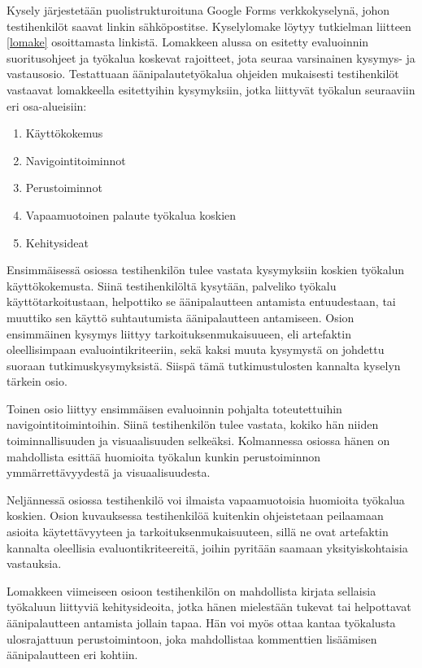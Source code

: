\documentclass[utf8]{gradu3}
\begin{document}
Kysely järjestetään puolistrukturoituna Google Forms verkkokyselynä, johon testihenkilöt saavat linkin sähköpostitse. Kyselylomake löytyy tutkielman liitteen \ref{lomake} osoittamasta linkistä. Lomakkeen alussa on esitetty evaluoinnin suoritusohjeet ja työkalua koskevat rajoitteet, jota seuraa varsinainen kysymys- ja vastausosio. Testattuaan äänipalautetyökalua ohjeiden mukaisesti testihenkilöt vastaavat lomakkeella esitettyihin kysymyksiin, jotka liittyvät työkalun seuraaviin eri osa-alueisiin:

\begin{enumerate}
  \item Käyttökokemus
  \item Navigointitoiminnot
  \item Perustoiminnot
  \item Vapaamuotoinen palaute työkalua koskien
  \item Kehitysideat
\end{enumerate}

Ensimmäisessä osiossa testihenkilön tulee vastata kysymyksiin koskien työkalun käyttökokemusta. Siinä testihenkilöltä kysytään, palveliko työkalu käyttötarkoitustaan, helpottiko se äänipalautteen antamista entuudestaan, tai muuttiko sen käyttö suhtautumista äänipalautteen antamiseen. Osion ensimmäinen kysymys liittyy tarkoituksenmukaisuueen, eli artefaktin oleellisimpaan evaluointikriteeriin, sekä kaksi muuta kysymystä on johdettu suoraan tutkimuskysymyksistä. Siispä tämä tutkimustulosten kannalta kyselyn tärkein osio.

Toinen osio liittyy ensimmäisen evaluoinnin pohjalta toteutettuihin navigointitoimintoihin. Siinä testihenkilön tulee vastata, kokiko hän niiden toiminnallisuuden ja visuaalisuuden selkeäksi. Kolmannessa osiossa hänen on mahdollista esittää huomioita työkalun kunkin perustoiminnon ymmärrettävyydestä ja visuaalisuudesta.

Neljännessä osiossa testihenkilö voi ilmaista vapaamuotoisia huomioita työkalua koskien. Osion kuvauksessa testihenkilöä kuitenkin ohjeistetaan peilaamaan asioita käytettävyyteen ja tarkoituksenmukaisuuteen, sillä ne ovat artefaktin kannalta oleellisia evaluontikriteereitä, joihin pyritään saamaan yksityiskohtaisia vastauksia.

Lomakkeen viimeiseen osioon testihenkilön on mahdollista kirjata sellaisia työkaluun liittyviä kehitysideoita, jotka hänen mielestään tukevat tai helpottavat äänipalautteen antamista jollain tapaa. Hän voi myös ottaa kantaa työkalusta ulosrajattuun perustoimintoon, joka mahdollistaa kommenttien lisäämisen äänipalautteen eri kohtiin.
\end{document}
